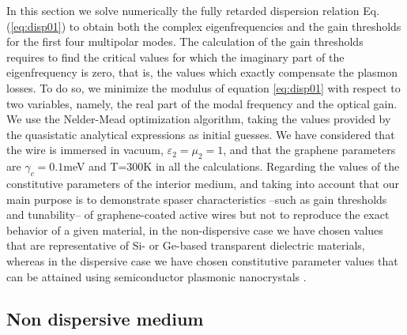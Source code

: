 \documentclass[9pt,twocolumn,twoside]{osajnl}
\begin{document}
In this section we solve numerically the fully retarded dispersion relation Eq. (\ref{eq:disp01}) to obtain both the complex eigenfrequencies and the gain thresholds for the first four multipolar modes. The calculation of the gain thresholds requires to find the critical values for which the imaginary part of the eigenfrequency is zero, that is, the values which exactly compensate the plasmon losses. 
To do so, we minimize the modulus of equation \eqref{eq:disp01} with respect to two  variables, namely, the real part of the modal frequency and the optical gain. We use the Nelder-Mead optimization algorithm, taking the values provided by the 
quasistatic analytical expressions as initial guesses. We have considered that the wire is immersed in vacuum,  $\varepsilon_2=\mu_2=1$, and that the graphene parameters are $\gamma_c=0.1$meV and T=$300$K in all the calculations. 
%
Regarding the values of the constitutive parameters of the interior medium, and taking into account that our main purpose is to demonstrate spaser characteristics --such as gain thresholds and tunability-- of graphene-coated active wires but not to reproduce the exact behavior of a given material, in the non-dispersive case we have chosen values that are representative of Si- or Ge-based transparent dielectric materials, whereas in the dispersive case we have chosen constitutive parameter values that can be attained using semiconductor plasmonic nanocrystals  \cite{nanocristal2,nanocristal1,nanocristal4}.



\subsection{Non dispersive medium}
\end{document}
